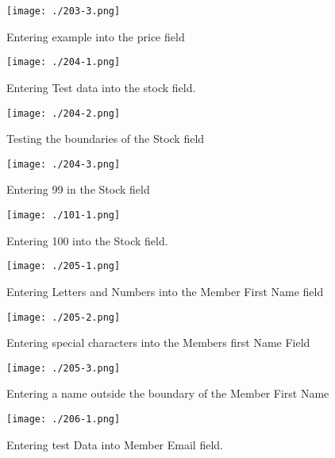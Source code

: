 \begin{figure}[H]
    \texttt{[image: ./203-3.png]}
    \caption{Entering example into the price field} \label{fig: character_in_price}
\end{figure}

\begin{figure}[H]
    \texttt{[image: ./204-1.png]}
    \caption{Entering Test data into the stock field.} \label{fig:stock_test}
\end{figure}

\begin{figure}[H]
    \texttt{[image: ./204-2.png]}
    \caption{Testing the boundaries of the Stock field} \label{fig:stock_boundary}
\end{figure}

\begin{figure}[H]
    \texttt{[image: ./204-3.png]}
    \caption{Entering 99 in the Stock field} \label{fig:stock_99}
\end{figure}

\begin{figure}[H]
    \texttt{[image: ./101-1.png]}
    \caption{Entering 100 into the Stock field.} \label{fig:stock_100}
\end{figure}

\begin{figure}[H]
    \texttt{[image: ./205-1.png]}
    \caption{Entering Letters and Numbers into the Member First Name field} \label{fig:let_num_member_name}
\end{figure}

\begin{figure}[H]
    \texttt{[image: ./205-2.png]}
    \caption{Entering special characters into the Members first Name Field} \label{fig:special_first_name}
\end{figure}

\begin{figure}[H]
    \texttt{[image: ./205-3.png]}
    \caption{Entering a name outside the boundary of the Member First Name} \label{fig:boundary_member_name}
\end{figure}

\begin{figure}[H]
    \texttt{[image: ./206-1.png]}
    \caption{Entering test Data into Member Email field.} \label{fig:test1_email}
\end{figure}

